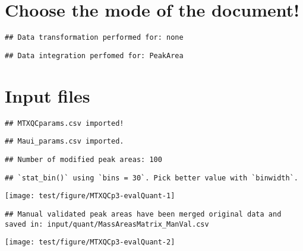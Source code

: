 \documentclass[9pt,]{article}
\begin{document}
\section{Choose the mode of the
document!}\label{choose-the-mode-of-the-document}

\begin{verbatim}
## Data transformation performed for: none
\end{verbatim}

\begin{verbatim}
## Data integration perfomed for: PeakArea
\end{verbatim}

\section{Input files}\label{input-files}

\begin{verbatim}
## MTXQCparams.csv imported!
\end{verbatim}

\begin{verbatim}
## Maui_params.csv imported.
\end{verbatim}

\begin{verbatim}
## Number of modified peak areas: 100
\end{verbatim}

\begin{verbatim}
## `stat_bin()` using `bins = 30`. Pick better value with `binwidth`.
\end{verbatim}

\begin{center}\texttt{[image: test/figure/MTXQCp3-evalQuant-1]} \end{center}

\begin{verbatim}
## Manual validated peak areas have been merged original data and saved in: input/quant/MassAreasMatrix_ManVal.csv
\end{verbatim}

\begin{center}\texttt{[image: test/figure/MTXQCp3-evalQuant-2]} \end{center}
\newpage
\singlespacing 
\end{document}
